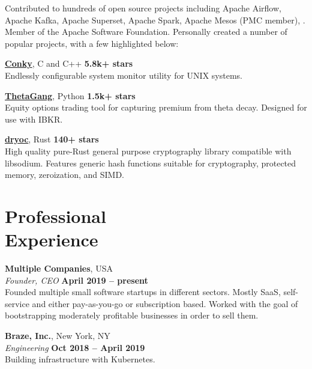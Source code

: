 \documentclass[margin,line]{resume}
\begin{document}
\begin{resume}
    Contributed to hundreds of open source projects including Apache Airflow,
    Apache Kafka, Apache Superset, Apache Spark, Apache Mesos (PMC member), . Member of the
    Apache Software Foundation. Personally created a number of popular projects,
    with a few highlighted below:

    \href{https://github.com/brndnmtthws/conky}{\textbf{Conky}}, C and C++ \hfill \textbf{5.8k+ stars}\\
    Endlessly configurable system monitor utility for UNIX systems.

    \href{https://github.com/brndnmtthws/thetagang}{\textbf{ThetaGang}}, Python \hfill \textbf{1.5k+ stars}\\
    Equity options trading tool for capturing premium from theta decay. Designed
    for use with IBKR.

    \href{https://github.com/brndnmtthws/dryoc}{\textbf{dryoc}}, Rust \hfill \textbf{140+ stars}\\
    High quality pure-Rust general purpose cryptography library compatible with
    libsodium.  Features generic hash functions suitable for cryptography,
    protected memory, zeroization, and SIMD.

    \vspace{3mm}

    \section{\mysidestyle Professional\\Experience}

    \textbf{Multiple Companies}, USA \vspace{2mm}\\\vspace{1mm}%
    \textsl{Founder, CEO} \hfill \textbf{April 2019 -- present}\\
    Founded multiple small software startups in different sectors. Mostly SaaS,
    self-service and either pay-as-you-go or subscription based. Worked with the
    goal of bootstrapping moderately profitable businesses in order to sell
    them.

    \textbf{Braze, Inc.}, New York, NY \vspace{2mm}\\\vspace{1mm}%
    \textsl{Engineering} \hfill \textbf{Oct 2018 -- April 2019}\\
    Building infrastructure with Kubernetes.
    

\end{resume}
\end{document}
